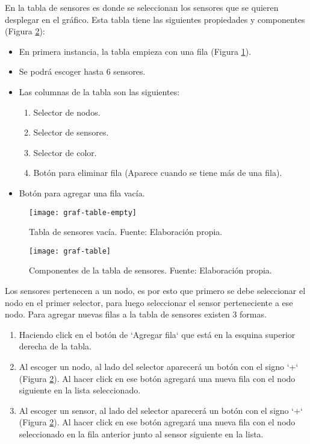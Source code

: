 En la tabla de sensores es donde se seleccionan los sensores que se quieren desplegar en el gráfico. Esta tabla tiene las siguientes propiedades y componentes (Figura \ref{fig:graf-table}):
\begin{itemize}
    \item En primera instancia, la tabla empieza con una fila (Figura \ref{fig:graf-table-empty}).
    \item Se podrá escoger hasta 6 sensores.
    \item Las columnas de la tabla son las siguientes:
          \begin{enumerate}
              \item Selector de nodos.
              \item Selector de sensores.
              \item Selector de color.
              \item Botón para eliminar fila (Aparece cuando se tiene más de una fila).
          \end{enumerate}
    \item Botón para agregar una fila vacía.
\end{itemize}

\begin{figure}[H]
	\centering
	\texttt{[image: graf-table-empty]}
	\caption{\label{fig:graf-table-empty} Tabla de sensores vacía. Fuente: Elaboración propia.}
\end{figure}

\begin{figure}[H]
	\centering
	\texttt{[image: graf-table]}
	\caption{\label{fig:graf-table} Componentes de la tabla de sensores. Fuente: Elaboración propia.}
\end{figure}

Los sensores pertenecen a un nodo, es por esto que primero se debe seleccionar el nodo en el primer selector, para luego seleccionar el sensor perteneciente a ese nodo.
Para agregar nuevas filas a la tabla de sensores existen 3 formas.
\begin{enumerate}
    \item Haciendo click en el botón de `Agregar fila` que está en la esquina superior derecha de la tabla.
    \item Al escoger un nodo, al lado del selector aparecerá un botón con el signo `+` (Figura \ref{fig:graf-table}). Al hacer click en ese botón agregará una nueva fila con el nodo siguiente en la lista seleccionado.
    \item Al escoger un sensor, al lado del selector aparecerá un botón con el signo `+` (Figura \ref{fig:graf-table}). Al hacer click en ese botón agregará una nueva fila con el nodo seleccionado en la fila anterior junto al sensor siguiente en la lista.
\end{enumerate}

